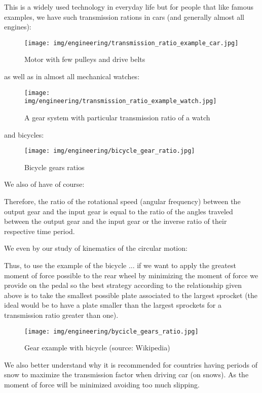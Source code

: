 	This is a widely used technology in everyday life but for people that like famous examples, we have such transmission rations in cars (and generally almost all engines):
	\begin{figure}[H]
		\begin{center}
			\texttt{[image: img/engineering/transmission\_ratio\_example\_car.jpg]}
		\end{center}	
		\caption{Motor with few pulleys and drive belts}
	\end{figure}
	as well as in almost all mechanical watches:
	\begin{figure}[H]
		\begin{center}
			\texttt{[image: img/engineering/transmission\_ratio\_example\_watch.jpg]}
		\end{center}	
		\caption{A gear system with particular transmission ratio of a watch}
	\end{figure}
	and bicycles:
	\begin{figure}[H]
		\begin{center}
			\texttt{[image: img/engineering/bicycle\_gear\_ratio.jpg]}
		\end{center}	
		\caption{Bicycle gears ratios}
	\end{figure}
	We also of have of course:
	
	Therefore, the ratio of the rotational speed (angular frequency) between the output gear and the input gear is equal to the ratio of the angles traveled between the output gear and the input gear or the inverse ratio of their respective time period.
	
	We even by our study of kinematics of the circular motion:
	
	
	Thus, to use the example of the bicycle ... if we want to apply the greatest moment of force possible to the rear wheel by minimizing the moment of force we provide on the pedal so the best strategy according to the relationship given above is to take the smallest possible plate associated to the largest sprocket (the ideal would be to have a plate smaller than the largest sprockets for a transmission ratio greater than one).
	\begin{figure}[H]
		\begin{center}
			\texttt{[image: img/engineering/bycicle\_gears\_ratio.jpg]}
		\end{center}	
		\caption{Gear example with bicycle (source: Wikipedia)}
	\end{figure}
	We also better understand why it is recommended for countries having periods of snow to maximize the transmission factor when driving car (on snows). As the moment of force will be minimized avoiding too much slipping.
	
